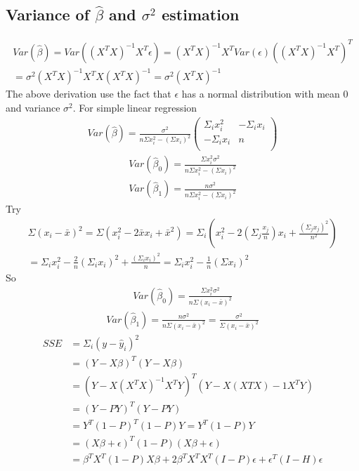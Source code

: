 \documentclass[a4paper]{article}
\begin{document}
\subsection{Variance of $\hat \beta$ and $\sigma^2$ estimation}
\begin{align*}
Var(\hat \beta)
=Var((X^TX)^{-1}X^T \epsilon)
=(X^TX)^{-1}X^T Var( \epsilon) ((X^TX)^{-1}X^T)^T\\
=\sigma^2 (X^TX)^{-1}X^T  X (X^TX)^{-1}
=\sigma^2 (X^TX)^{-1}
\end{align*}
The above derivation use the fact that $\epsilon$ has a normal distribution with mean 0 and variance $\sigma^2$.
For simple linear regression
\begin{align*}
Var(\hat \beta)
=\frac{\sigma^2}{n\Sigma x_i^2 - (\Sigma x_i)^2} \left(  \begin{array} {cc}
	          \Sigma_i x_i^2 & -\Sigma_i x_i \\
		 -\Sigma_i x_i &n\\
		\end{array}
		\right) 
\end{align*}
\begin{align*}
Var(\hat \beta_0) =\frac{\Sigma x_i^2 \sigma^2}{n\Sigma x_i^2 - (\Sigma x_i)^2} 
\end{align*}
\begin{align*}
Var(\hat \beta_1) =\frac{n \sigma^2}{n\Sigma x_i^2 - (\Sigma x_i)^2} 
\end{align*}
Try
\begin{align*}
\Sigma (x_i- \bar x)^2 = \Sigma(x_i^2 - 2 \bar x x_i+ \bar x^2)
= \Sigma_i(x_i^2 - 2 (\Sigma_j \frac{x_j}{n}) x_i + \frac{ (\Sigma_j x_j)^2} {n^2})\\
=\Sigma_ix_i^2 - \frac{2}{n} (\Sigma_i x_i)^2 + \frac{ (\Sigma_i x_i)^2} {n}
= \Sigma_i x^2_i - \frac{1}{n} (\Sigma x_i)^2
\end{align*}
So
\begin{align*}
Var(\hat \beta_0) =\frac{\Sigma x_i^2 \sigma^2}{n\Sigma (x_i- \bar x)^2 } 
\end{align*}
\begin{align*}
Var(\hat \beta_1) =\frac{n \sigma^2}{n\Sigma (x_i- \bar x)^2} = \frac{\sigma^2}{\Sigma (x_i- \bar x)^2}
\end{align*}
\begin{align*}
SSE
&=\Sigma_i (y-\hat y_i)^2 \\
& = (Y-X\beta)^T(Y-X\beta) \\
& = (Y-X(X^TX)^{-1}X^TY)^T(Y-X(XTX)-1X^TY) \\
& = (Y-PY)^T(Y-PY) \\
& = Y^T(1-P)^T(1-P)Y = Y^T(1-P)Y \\
& = (X\beta + \epsilon) ^T (1-P)(X\beta+\epsilon) \\
& = \beta^T X^T (1-P)X\beta + 2\beta^T X^T X^T(I-P)\epsilon 
   + \epsilon^T(I-H)\epsilon 
\end{align*}
\end{document}
